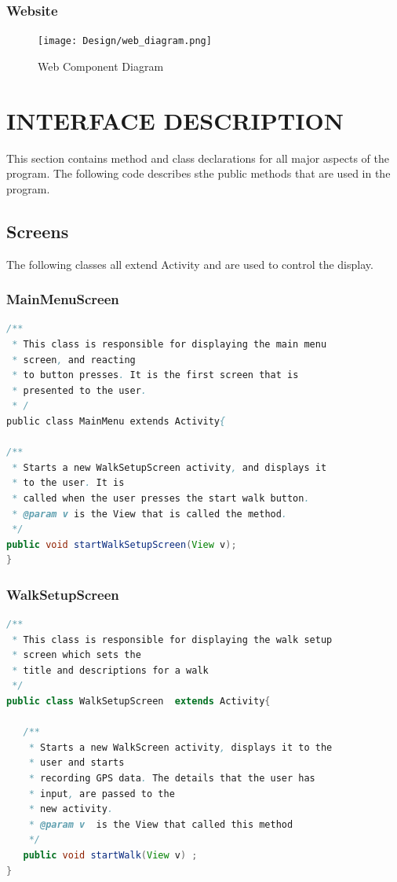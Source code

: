 \documentclass[12pt]{article}
\begin{document}
\subsubsection{Website}
\clearpage
\begin{figure}[htp]

\centering
\texttt{[image: Design/web\_diagram.png]}
\caption{Web Component Diagram}
\label{Web Component Diagram}
\end{figure}
\section{INTERFACE DESCRIPTION}
This section contains method and class declarations for all major aspects of the program. The following code describes sthe public methods that are used in the program.
\subsection{Screens}
The following classes all extend Activity and are used to control the display.

\subsubsection{MainMenuScreen}
\begin{lstlisting}[language=java]
/**
 * This class is responsible for displaying the main menu 
 * screen, and reacting
 * to button presses. It is the first screen that is 
 * presented to the user.
 * /
public class MainMenu extends Activity{

/**
 * Starts a new WalkSetupScreen activity, and displays it
 * to the user. It is
 * called when the user presses the start walk button.
 * @param v is the View that is called the method.
 */
public void startWalkSetupScreen(View v);
}
\end{lstlisting}
\subsubsection{WalkSetupScreen}
\begin{lstlisting}[language=java]
/**
 * This class is responsible for displaying the walk setup
 * screen which sets the
 * title and descriptions for a walk
 */
public class WalkSetupScreen  extends Activity{

   /**
    * Starts a new WalkScreen activity, displays it to the 
    * user and starts
    * recording GPS data. The details that the user has 
    * input, are passed to the
    * new activity.
    * @param v  is the View that called this method
    */
   public void startWalk(View v) ;
}
\end{lstlisting}
\end{document}
